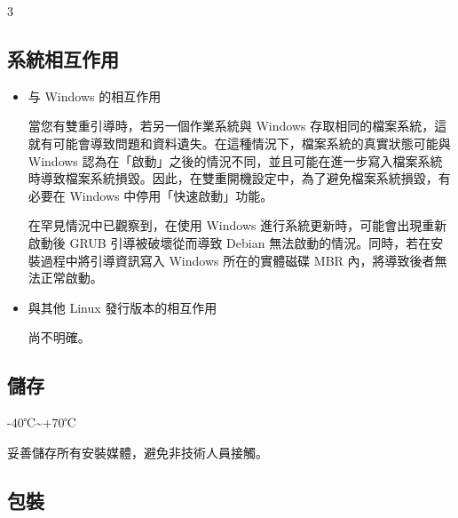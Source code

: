 \documentclass{article}
\begin{document}
\begin{multicols*}{3}




	\begin{tcolorbox}
	\section*{系統相互作用}
	\end{tcolorbox}
	\begin{itemize}[leftmargin=*]
		\setlength{\parindent}{0pt}

		\item 与 Windows 的相互作用

		當您有雙重引導時，若另一個作業系統與 Windows 存取相同的檔案系統，這就有可能會導致問題和資料遺失。在這種情況下，檔案系統的真實狀態可能與 Windows 認為在「啟動」之後的情況不同，並且可能在進一步寫入檔案系統時導致檔案系統損毀。因此，在雙重開機設定中，為了避免檔案系統損毀，有必要在 Windows 中停用「快速啟動」功能。


		在罕見情況中已觀察到，在使用 Windows 進行系統更新時，可能會出現重新啟動後 GRUB 引導被破壞從而導致 Debian 無法啟動的情況。同時，若在安裝過程中將引導資訊寫入 Windows 所在的實體磁碟 MBR 內，將導致後者無法正常啟動。

		\item 與其他 Linux 發行版本的相互作用

		尚不明確。

	\end{itemize}


	\begin{tcolorbox}
	\section*{儲存}
	\end{tcolorbox}

	-40℃\textasciitilde +70℃

	妥善儲存所有安裝媒體，避免非技術人員接觸。

	\medskip


	\begin{tcolorbox}
	\section*{包裝}
	\end{tcolorbox}


\end{multicols*}
\end{document}
